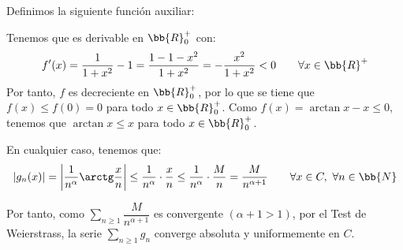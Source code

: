 \begin{ejercicio}
\begin{description}
        Definimos la siguiente función auxiliar:
        
        Tenemos que es derivable en $\bb{R}^+_0$ con:
        \begin{equation*}
            f'(x) = \frac{1}{1+x^2} - 1 = \frac{1-1-x^2}{1+x^2} = -\frac{x^2}{1+x^2} < 0 \qquad \forall x\in \bb{R}^+
        \end{equation*}
        Por tanto, $f$ es decreciente en $\bb{R}^+_0$, por lo que se tiene que $f(x) \leq f(0) = 0$ para todo $x\in \bb{R}^+_0$.
        Como $f(x)=\arctan x -x\leq 0$, tenemos que $\arctan x \leq x$ para todo $x\in \bb{R}^+_0$. 
    \end{description}

    En cualquier caso, tenemos que:
    \begin{equation*}
        \left|g_n(x)\right| = \left|\frac{1}{n^\alpha} \arctg \frac{x}{n}\right| \leq \frac{1}{n^\alpha} \cdot \frac{x}{n} \leq \frac{1}{n^\alpha} \cdot \frac{M}{n} = \frac{M}{n^{\alpha+1}} \qquad \forall x\in C,~\forall n\in \bb{N}
    \end{equation*}

    Por tanto, como $\sum\limits_{n\geq 1}\dfrac{M}{n^{\alpha+1}}$ es convergente $(\alpha+1>1)$, por el Test de Weierstrass, la serie $\sum\limits_{n\geq 1}g_n$ converge absoluta y uniformemente en $C$.    
\end{ejercicio}

